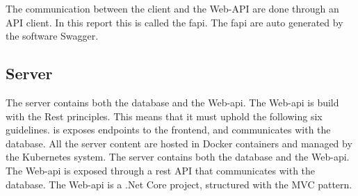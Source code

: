 The communication between the client and the Web-API are done through an API client. In this report this is called the \gls{fapi}. The \gls{fapi} are auto generated by the software Swagger.

\subsection{Server}
The server contains both the database and the Web-api. The Web-api is build with the Rest principles. This means that it must uphold the following six guidelines\cite{REST}. is exposes endpoints to the frontend, and communicates with the database. 
All the server content are hosted in Docker containers and managed by the Kubernetes system. 
The server contains both the database and the Web-api. The Web-api is exposed through a rest API that communicates with the database. The Web-api is a .Net Core project, structured with the MVC pattern.



